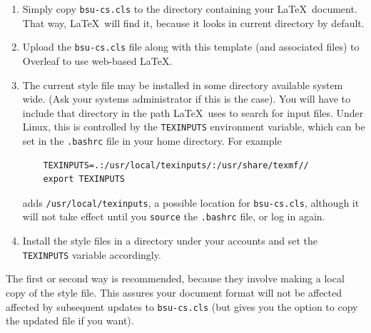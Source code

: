 \documentclass[dissertation]{bsu-cs}  %
\begin{document}
\begin{enumerate}
\item Simply copy \texttt{bsu-cs.cls} to the directory containing your \LaTeX\ document.
That way, \LaTeX\ will find it, because it looks in current directory by default.

\item Upload the \texttt{bsu-cs.cls} file along with this template (and associated files)
to Overleaf to use web-based LaTeX.

\item The current style file may be installed in some directory available system wide.  (Ask your
systems administrator if this is the case).  You will have to include that directory in the path
\LaTeX\ uses to search for input files.  Under Linux, this is controlled by the \texttt{TEXINPUTS}
environment variable, which can be set in the \texttt{.bashrc} file in your home directory.
For example
%
\begin{verbatim}
    TEXINPUTS=.:/usr/local/texinputs/:/usr/share/texmf//
    export TEXINPUTS
\end{verbatim}
adds \texttt{/usr/local/texinputs}, a possible location for \texttt{bsu-cs.cls}, although it
will not take effect until you \texttt{source} the \texttt{.bashrc} file, or log in again.

\item Install the style files in a directory under your accounts and set the \texttt{TEXINPUTS}
variable accordingly.

\end{enumerate}

%

The first or second way is recommended, because they involve making a local copy of the style
file.  This assures your document format will not be affected affected by subsequent updates
to \texttt{bsu-cs.cls} (but gives you the option to copy the updated file if you want).
\end{document}
